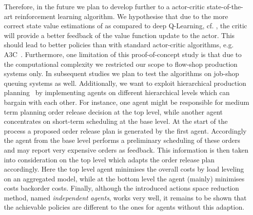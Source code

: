 \documentclass[envcountsame]{llncs}
\newcommand\MS[2][r]{\ifx t#1 \textcolor{blue}{[\textbf{MS:} #2]}
  \else \begin{center}\textcolor{blue}{\textbf{MS:} #2} \end{center} \fi}
\begin{document}
Therefore, in the future we plan to develop \ARA{} further to a actor-critic state-of-the-art
reinforcement learning algorithm. We hypothesise that due to the more correct state value
estimations of \ARA{} as compared to deep Q-Learning, cf. \citet{schneckenreither2020average}, the
critic will provide a better feedback of the value function update to the actor. This should lead to
better policies than with standard actor-critic algorithms, e.g. A3C~\citep{mnih2016asynchronous}.
%
Furthermore, one limitation of this proof-of-concept study is that due to the computational
complexity we restricted our scope to flow-shop production systems only. In subsequent studies we
plan to test the algorithms on job-shop queuing systems as well.
%
Additionally, we want to exploit hierarchical production
planning~\citep{schneeweibeta1995hierarchical} by implementing agents on different hierarchical
levels which can bargain with each other. For instance, one agent might be responsible for medium
term planning order release decision at the top level, while another agent concentrates on
short-term scheduling at the base level. At the start of the process a proposed order release plan
is generated by the first agent. Accordingly the agent from the base level performs a preliminary
scheduling of these orders and may report very expensive orders as feedback. This information is
then taken into consideration on the top level which adapts the order release plan accordingly. Here
the top level agent minimises the overall costs by load leveling on an aggregated model, while at
the bottom level the agent (mainly) minimises costs backorder costs.
%
Finally, although the introduced actions space reduction method, named \textit{independent agents},
works very well, it remains to be shown that the achievable policies are different to the ones for
agents without this adaption.





\end{document}
